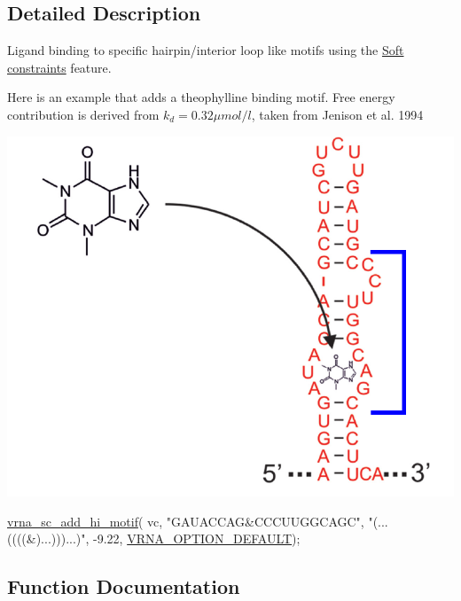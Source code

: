 \subsection{Detailed Description}
Ligand binding to specific hairpin/interior loop like motifs using the \hyperlink{group__soft__constraints}{Soft constraints} feature. 

Here is an example that adds a theophylline binding motif. Free energy contribution is derived from $k_d = 0.32 \mu mol / l $, taken from Jenison et al. 1994

 
\begin{DoxyImageNoCaption}
  \mbox{\includegraphics[width=\textwidth,height=\textheight/2,keepaspectratio=true]{theo_aptamer}}
\end{DoxyImageNoCaption}



\begin{DoxyCode}
\hyperlink{group__constraints__ligand_gaa6ff0113a3a76dc0b8d62961f4e1dfa0}{vrna\_sc\_add\_hi\_motif}( vc,
                      \textcolor{stringliteral}{"GAUACCAG&CCCUUGGCAGC"},
                      \textcolor{stringliteral}{"(...((((&)...)))...)"},
                      -9.22, \hyperlink{group__fold__compound_gacea5b7ee6181c485f36e2afa0e9089e4}{VRNA\_OPTION\_DEFAULT}); 
\end{DoxyCode}
 

\subsection{Function Documentation}
